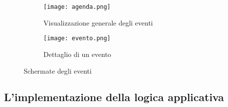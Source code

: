 \begin{figure}[htbp]
    \centering
    \begin{subfigure}{0.49\textwidth}
        \centering
        \texttt{[image: agenda.png]}
        \caption{Visualizzazione generale degli eventi}
    \end{subfigure}
    \hfill
    \begin{subfigure}{0.49\textwidth}
        \centering
        \texttt{[image: evento.png]}
        \caption{Dettaglio di un evento}
    \end{subfigure}
    \caption{Schermate degli eventi}
\end{figure}

\clearpage


\subsection{L'implementazione della logica applicativa}

